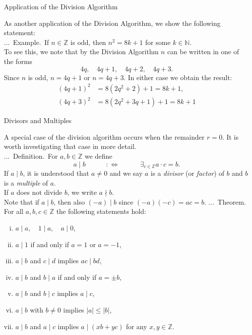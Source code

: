 \documentclass[smaller,hyperref={CJKbookmarks=true}]{beamer}
\newcommand{\N}{\mathbb{N}} \newcommand{\Z}{\mathbb{Z}} \newcommand{\Q}{\mathbb{Q}}
\newcounter{zhuo}[subsection]
\renewcommand{\thezhuo}{\thesection.\thesubsection.\arabic{zhuo}}
\newenvironment{DEFINITION}{\stepcounter{zhuo}\alert{\thezhuo.~Definition.\,}}{}
\newenvironment{EXAMPLE}{\stepcounter{zhuo}\alert{\!\thezhuo.~Example.\,}}{}
\newenvironment{THEOREM}{\stepcounter{zhuo}\alert{\thezhuo.~Theorem.\,}}{}
\begin{document}
\begin{frame}[t]{Application of the Division Algorithm}
\begin{spacing}{1.2}
As another application of the Division Algorithm, we show the following
statement:\\[4pt]
\begin{EXAMPLE}
If $n\in\Z$ is odd, then $n^2=8k+1$ for some $k\in\N$.\\[4pt]
To see this, we note that by the Division Algorithm $n$ can be written in
one of the forms
\[4q,\quad 4q+1,\quad 4q+2,\quad 4q+3.\]
Since $n$ is odd, $n=4q+1$ or $n=4q+3$. In either case we obtain the result:
\begin{align*}
  (4q+1)^2 &=8(2q^2+2)+1=8k+1, \\
  (4q+3)^2 &=8(2q^2+3q+1)+1=8k+1
\end{align*}
\end{EXAMPLE}
\end{spacing}
\end{frame}
\begin{frame}{Divisors and Multiples}
\begin{spacing}{1.1}
A special case of the division algorithm occurs when the remainder $r = 0$.
It is worth investigating that case in more detail.\\[4pt]
\begin{DEFINITION}
For $a,b\in\Z$ we define
\[a\mid b\qquad\quad:\Leftrightarrow\qquad\quad
\mathop{\exists}_{c\in\Z}a\cdot c=b.\]
If $a\mid b$, it is understood that $a\neq0$ and we say $a$ is a \emph{divisor} (or \emph{factor}) of $b$ and $b$ is a \emph{multiple} of $a$.\\[5pt]
If $a$ does not divide $b$, we write $a\nmid b$.\\[4pt]
Note that if $a\mid b$, then also $(-a)\mid b$ since $(-a)(-c)=ac=b$.
\end{DEFINITION}
\newpage
\vspace*{10pt}
\begin{THEOREM}
For all $a,b,c\in\Z$ the following statements hold:
\begin{enumerate}[(i)]
  \item $a\mid a,\quad1\mid a,\quad a\mid0$,
  \item $a\mid 1$ if and only if $a=1$ or $a=-1$,
  \item $a\mid b$ and $c\mid d$ implies $ac\mid bd$,
  \item $a\mid b$ and $b\mid a$ if and only if $a=\pm b$,
  \item $a\mid b$ and $b\mid c$ implies $a\mid c$,
  \item $a\mid b$ with $b\neq0$ implies $|a|\leq |b|$,
  \item $a\mid b$ and $a\mid c$ implies $a\mid(xb+yc)$ for any $x,y\in\Z$.
\end{enumerate}
\end{THEOREM}
\end{spacing}
\end{frame}
\end{document}
